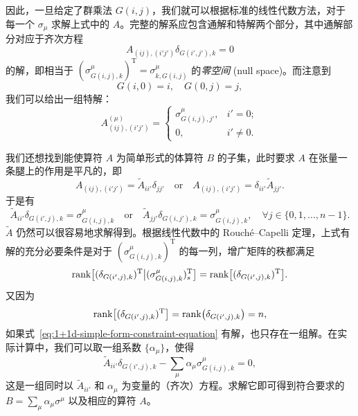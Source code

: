 因此，一旦给定了群乘法 $G(i,j)$，我们就可以根据标准的线性代数方法，对于每一个 $\sigma_\mu$ 求解上式中的 $A$。完整的解系应包含通解和特解两个部分，其中通解部分对应于齐次方程
\begin{equation}
  A_{(ij), (i'j')} \delta_{G(i',j'), k} = 0
\end{equation}
的解，即相当于 $(\sigma^\mu_{G(i,j),k})^{\mathrm{T}}=\sigma^\mu_{k,G(i,j)}$ 的\emph{零空间} (null space)。而注意到
\begin{equation}
  G(i,0) = i, \quad G(0,j) = j,
\end{equation}
我们可以给出一组特解：
\begin{equation}
  A^{(\mu)}_{(ij), (i'j')} = \begin{cases}
    \sigma^\mu_{G(i,j), j'}, & i' = 0; \\
    0, & i' \neq 0.
  \end{cases}
  \label{eq:1+1d-specific-solution}
\end{equation}

我们还想找到能使算符 $A$ 为简单形式的体算符 $B$ 的子集，此时要求 $A$ 在张量一条腿上的作用是平凡的，即
\begin{equation}
  A_{(ij), (i'j')} = \tilde{A}_{ii'} \delta_{jj'} \quad \text{or} \quad
  A_{(ij), (i'j')} = \delta_{ii'} \tilde{A}_{jj'}.
\end{equation}
于是有
\begin{equation}
  \tilde{A}_{ii'} \delta_{G(i',j), k} = \sigma^\mu_{G(i,j), k} \quad \text{or} \quad
  \tilde{A}_{jj'} \delta_{G(i,j'), k} = \sigma^\mu_{G(i,j), k}, \quad
  \forall j \in \{ 0, 1, \dots, n-1 \}.
  \label{eq:1+1d-simple-form-constraint-equation}
\end{equation}
$\tilde{A}$ 仍然可以很容易地求解得到。根据线性代数中的 Rouch\'e--Capelli 定理，上式有解的充分必要条件是对于 $(\sigma^\mu_{G(i,j),k})^{\mathrm{T}}$ 的每一列，增广矩阵的秩都满足
\begin{equation}
    \operatorname{rank}\bigl[ (\delta_{G(i',j), k})^{\mathrm{T}} \big| (\sigma^\mu_{G(i,j),k})^{\mathrm{T}}_s \bigr]
  = \operatorname{rank}\bigl[ (\delta_{G(i',j), k})^{\mathrm{T}} \bigr].
\end{equation}
又因为
\begin{equation}
    \operatorname{rank}\bigl[ (\delta_{G(i',j), k})^{\mathrm{T}} \bigr]
  = \operatorname{rank}\bigl( \delta_{G(i',j), k} \bigr) = n,
\end{equation}
如果式~\eqref{eq:1+1d-simple-form-constraint-equation} 有解，也只存在一组解。在实际计算中，我们可以取一组系数 $\{\alpha_\mu\}$，使得
\begin{equation}
  \tilde{A}_{ii'} \delta_{G(i',j), k} - \sum_\mu \alpha_\mu \sigma^\mu_{G(i,j), k} = 0,
  \label{eq:1+1d-simple-form-augmented-constraint-equation}
\end{equation}
这是一组同时以 $\tilde{A}_{ii'}$ 和 $\alpha_\mu$ 为变量的（齐次）方程。求解它即可得到符合要求的 $B=\sum_\mu\alpha_\mu\sigma^\mu$ 以及相应的算符 $A$。

